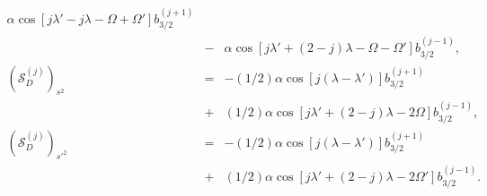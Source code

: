 \documentclass [12pt, a4paper] {article}
\begin{document}
\begin {eqnarray}
    \alpha\cos[j\lambda' - j\lambda - \Omega + \Omega']
    b_{3/2}^{(j+1)}
    \\\nonumber
    &-&
    \alpha\cos[j\lambda' + (2-j)\lambda - \Omega - \Omega']
    b_{3/2}^{(j-1)},
    \\
    \left(\mathcal{S}_D^{(j)}\right)_{s^2} 
    &=& 
    -(1/2)\alpha
    \cos[j(\lambda - \lambda')]b_{3/2}^{(j + 1)}
    \\\nonumber
    &+&
    (1/2)\alpha
    \cos[j\lambda' + (2-j)\lambda - 2\Omega]b_{3/2}^{(j - 1)},
    \\
    \left(\mathcal{S}_D^{(j)}\right)_{s'^2} 
    &=& 
    -(1/2)\alpha
    \cos[j(\lambda - \lambda')]b_{3/2}^{(j + 1)}
    \\\nonumber
    &+&
    (1/2)\alpha
    \cos[j\lambda' + (2-j)\lambda - 2\Omega']b_{3/2}^{(j - 1)}.
\end {eqnarray}
\end{document}
